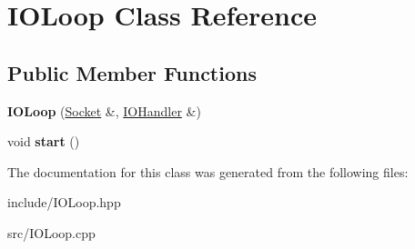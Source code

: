\hypertarget{classIOLoop}{}\section{I\+O\+Loop Class Reference}
\label{classIOLoop}
\subsection*{Public Member Functions}
\begin{DoxyCompactItemize}
\item 
{\bfseries I\+O\+Loop} (\hyperlink{classSocket}{Socket} \&, \hyperlink{classIOHandler}{I\+O\+Handler} \&)\hypertarget{classIOLoop_a991895206fdd315c28a9437d0b00e2a3}{}\label{classIOLoop_a991895206fdd315c28a9437d0b00e2a3}

\item 
void {\bfseries start} ()\hypertarget{classIOLoop_a227cd89b27b6f9cb302bf501943e2184}{}\label{classIOLoop_a227cd89b27b6f9cb302bf501943e2184}

\end{DoxyCompactItemize}


The documentation for this class was generated from the following files\+:\begin{DoxyCompactItemize}
\item 
include/I\+O\+Loop.\+hpp\item 
src/I\+O\+Loop.\+cpp\end{DoxyCompactItemize}

